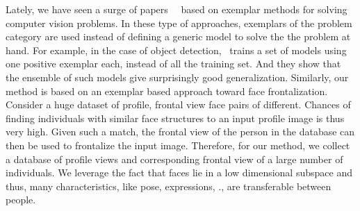 Lately, we have seen a surge of papers~\cite{malisiewicz-iccv11}~\cite{B-WeiBoy08} based on exemplar methods for solving computer vision problems. 
In these type of approaches, exemplars of the problem category are used instead of defining a
generic model to solve the 
the problem at hand. For example, in the case of object detection,~\cite{malisiewicz-iccv11} trains a set of models 
using one positive exemplar each, instead of all the training set. And they show that the ensemble of such 
models give surprisingly good generalization. Similarly, our method is based on an exemplar based approach 
toward face frontalization. Consider a huge dataset of profile, frontal view face pairs of different. Chances of finding 
individuals with similar face structures to an input profile image is thus very high. Given such a
match, the frontal view of the person in the database can then be used to frontalize the input
image.  Therefore, for our method, we collect a database 
of profile views and corresponding frontal view of a large number of individuals. We leverage the fact that 
faces lie in a low dimensional subspace and thus, many characteristics, like pose, expressions, \etc.,
are transferable between people.
